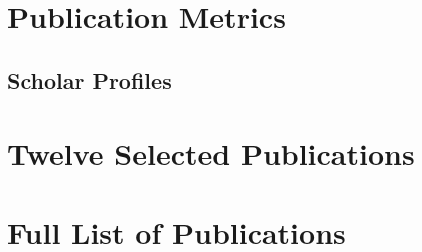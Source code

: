 \documentclass[10pt,a4paper]{article}
\begin{document}
%


















\newpage
\section*{Publication Metrics}%


\subsection*{Scholar Profiles}%


\section*{Twelve Selected Publications}%












\newpage


\section*{Full List of Publications}%

\end{document}
